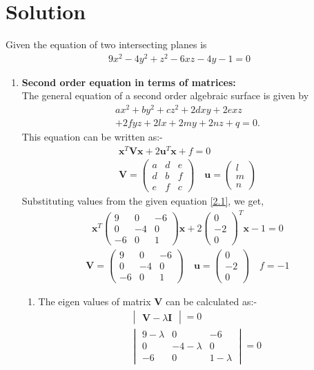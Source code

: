 \documentclass[journal,12pt,twocolumn]{IEEEtran}
\let\vec\mathbf
\numberwithin{equation}{subsection}
\newcommand{\myvec}[1]{\ensuremath{\begin{pmatrix}#1\end{pmatrix}}}
\newcommand{\mydet}[1]{\ensuremath{\begin{vmatrix}#1\end{vmatrix}}}
\begin{document}
\section{Solution}
Given the equation of two intersecting planes is 
\begin{align}
   9x^2 -4y^2 +z^2 -6xz -4y -1 =0\label{2.1}
\end{align}
\begin{enumerate}
\item \textbf{Second order equation in terms of matrices:}\\
The general equation of a second order algebraic surface is given by
\begin{multline}
ax^2 + by^2 + cz^2 + 2dxy + 2exz \\+ 2fyz + 2lx + 2my + 2nz + q = 0.
\end{multline}
This equation can be written as:-
\begin{align}
\vec{x}^T\vec{V}\vec{x} +2 \vec{u}^T\vec{x}+f=0 \label{2.7}\\
\vec{V} = \myvec{a&d&e\\d&b&f\\e&f&c}\quad
\vec{u}= \myvec{l\\m\\n}
\end{align}
Substituting values from the given equation \eqref{2.1}, we get,
\begin{align}
\vec{x}^T\myvec{9&0&-6\\0&-4&0\\-6&0&1}\vec{x} + 2\myvec{0\\-2\\0}^T\vec{x}-1=0
\end{align}
\begin{align}
\vec{V} = \myvec{9&0&-6\\0&-4&0\\-6&0&1} \quad
\vec{u}= \myvec{0\\-2\\0} \quad f=-1
\end{align}
\begin{enumerate}
\item The eigen values of matrix $\vec{V}$ can be calculated as:-
\begin{align}
\mydet{\vec{V} - \lambda\vec{I}} = 0\\
\begin{vmatrix}9-\lambda&0&-6\\0&-4-\lambda&0\\-6&0&1-\lambda\end{vmatrix} = 0\\

\end{align}
\end{enumerate}
\end{enumerate}
\end{document}
